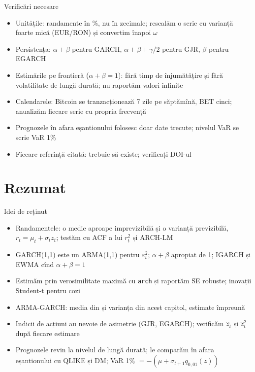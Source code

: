 \begin{frame}{Verificări necesare}
\itemsize{\small}
\begin{itemize}
    \item Unitățile: randamente în \%, nu în zecimale; rescalăm o serie cu varianță foarte mică (EUR/RON) și convertim înapoi $\omega$
    \item Persistența: $\alpha + \beta$ pentru GARCH, $\alpha + \beta + \gamma/2$ pentru GJR, $\beta$ pentru EGARCH
    \item Estimările pe frontieră ($\alpha + \beta = 1$): fără timp de înjumătățire și fără volatilitate de lungă durată; nu raportăm valori infinite
    \item Calendarele: Bitcoin se tranzacționează 7 zile pe săptămînă, BET cinci; anualizăm fiecare serie cu propria frecvență
    \item Prognozele în afara eșantionului folosesc doar date trecute; nivelul VaR se scrie VaR 1\%
    \item Fiecare referință citată: trebuie să existe; verificați DOI-ul
\end{itemize}
\end{frame}


\section{Rezumat}

\begin{frame}{Idei de reținut}
\itemsize{\small}
\begin{itemize}
    \item Randamentele: o medie aproape imprevizibilă și o varianță previzibilă, $r_t = \mu_t + \sigma_t z_t$; testăm cu ACF a lui $r_t^2$ și ARCH-LM
    \item GARCH(1,1) este un ARMA(1,1) pentru $\varepsilon_t^2$; $\alpha + \beta$ apropiat de 1; IGARCH și EWMA cînd $\alpha + \beta = 1$
    \item Estimăm prin verosimilitate maximă cu \texttt{arch} și raportăm SE robuste; inovații Student-t pentru cozi
    \item ARMA-GARCH: media din  și varianța din acest capitol, estimate împreună
    \item Indicii de acțiuni au nevoie de asimetrie (GJR, EGARCH); verificăm $\hat z_t$ și $\hat z_t^2$ după fiecare estimare
    \item Prognozele revin la nivelul de lungă durată; le comparăm în afara eșantionului cu QLIKE și DM; VaR 1\% $= -(\mu + \sigma_{t+1}q_{0{,}01}(z))$
\end{itemize}
\end{frame}

